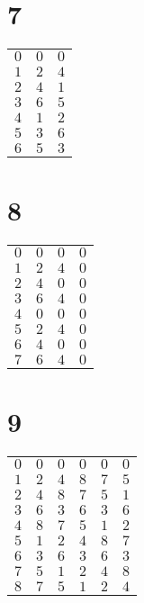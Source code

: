 \documentclass[a4paper]{scrartcl}
\begin{document}
\section*{7}
\begin{tabular}{rrr}
\toprule
$0$ & $0$ & $0$ \\
$1$ & $2$ & $4$ \\
$2$ & $4$ & $1$ \\
$3$ & $6$ & $5$ \\
$4$ & $1$ & $2$ \\
$5$ & $3$ & $6$ \\
$6$ & $5$ & $3$ \\
\bottomrule
\end{tabular}

\section*{8}
\begin{tabular}{rrrr}
\toprule
$0$ & $0$ & $0$ & $0$ \\
$1$ & $2$ & $4$ & $0$ \\
$2$ & $4$ & $0$ & $0$ \\
$3$ & $6$ & $4$ & $0$ \\
$4$ & $0$ & $0$ & $0$ \\
$5$ & $2$ & $4$ & $0$ \\
$6$ & $4$ & $0$ & $0$ \\
$7$ & $6$ & $4$ & $0$ \\
\bottomrule
\end{tabular}

\section*{9}
\begin{tabular}{rrrrrr}
\toprule
$0$ & $0$ & $0$ & $0$ & $0$ & $0$ \\
$1$ & $2$ & $4$ & $8$ & $7$ & $5$ \\
$2$ & $4$ & $8$ & $7$ & $5$ & $1$ \\
$3$ & $6$ & $3$ & $6$ & $3$ & $6$ \\
$4$ & $8$ & $7$ & $5$ & $1$ & $2$ \\
$5$ & $1$ & $2$ & $4$ & $8$ & $7$ \\
$6$ & $3$ & $6$ & $3$ & $6$ & $3$ \\
$7$ & $5$ & $1$ & $2$ & $4$ & $8$ \\
$8$ & $7$ & $5$ & $1$ & $2$ & $4$ \\
\bottomrule
\end{tabular}
\end{document}

